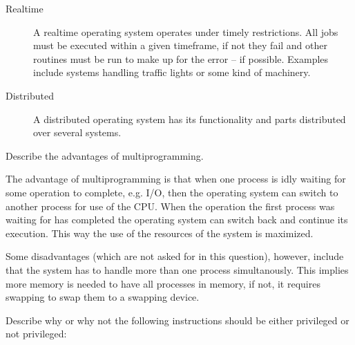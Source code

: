 \documentclass[a4paper,nocourse]{miunasgn}
\begin{document}
\begin{questions}
\begin{solution}
\begin{description}
			\item[Realtime] A realtime operating system operates under timely 
				restrictions.
				All jobs must be executed within a given timeframe, if not they fail 
				and other routines must be run to make up for the error -- if possible.
				Examples include systems handling traffic lights or some kind of 
				machinery.

			\item[Distributed] A distributed operating system has its functionality 
				and parts distributed over several systems.
				
		\end{description}
	\end{solution}
	
	\question\label{q:multiprogramming}
	Describe the advantages of multiprogramming.
	\begin{solution}
		The advantage of multiprogramming is that when one process is idly waiting 
		for some operation to complete, e.g. I/O, then the operating system can 
		switch to another process for use of the CPU.
		When the operation the first process was waiting for has completed the 
		operating system can switch back and continue its execution.
		This way the use of the resources of the system is maximized.

		Some disadvantages (which are not asked for in this question), however, 
		include that the system has to handle more than one process simultanously.  
		This implies more memory is needed to have all processes in memory, if not, 
		it requires swapping to swap them to a swapping device.
	\end{solution}

	\question\label{q:privinstr}
	Describe why or why not the following instructions should be either 
	privileged or not privileged:
\end{questions}
\end{document}
